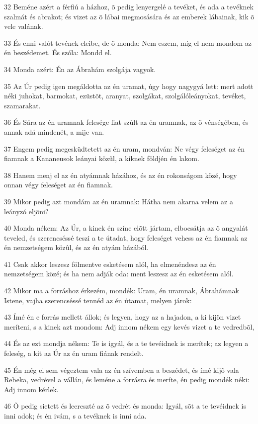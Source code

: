 \par 32 Beméne azért a férfiú a házhoz, õ pedig lenyergelé a tevéket, és ada a tevéknek szalmát és abrakot; és vizet az õ lábai megmosására és az emberek lábainak, kik õ vele valának.
\par 33 És enni valót tevének eleibe, de õ monda: Nem eszem, míg el nem mondom az én beszédemet. És szóla: Mondd el.
\par 34 Monda azért: Én az Ábrahám szolgája vagyok.
\par 35 Az Úr pedig igen megáldotta az én uramat, úgy hogy nagygyá lett: mert adott néki juhokat, barmokat, ezüstöt, aranyat, szolgákat, szolgálóleányokat, tevéket, szamarakat.
\par 36 És Sára az én uramnak felesége fiat szûlt az én uramnak, az õ vénségében, és annak adá mindenét, a mije van.
\par 37 Engem pedig megesküdtetett az én uram, mondván: Ne végy feleséget az én fiamnak a Kananeusok leányai közûl, a kiknek földjén én lakom.
\par 38 Hanem menj el az én atyámnak házához, és az én rokonságom közé, hogy onnan végy feleséget az én fiamnak.
\par 39 Mikor pedig azt mondám az én uramnak: Hátha nem akarna velem az a leányzó eljõni?
\par 40 Monda nékem: Az Úr, a kinek én színe elõtt jártam, elbocsátja az õ angyalát teveled, és szerencséssé teszi a te útadat, hogy feleséget vehess az én fiamnak az én nemzetségem közûl, és az én atyám házából.
\par 41 Csak akkor leszesz fölmentve esketésem alól, ha elmenéndesz az én nemzetségem közé; és ha nem adják oda: ment leszesz az én esketésem alól.
\par 42 Mikor ma a forráshoz érkezém, mondék: Uram, én uramnak, Ábrahámnak Istene, vajha szerencséssé tennéd az én útamat, melyen járok:
\par 43 Ímé én e forrás mellett állok; és legyen, hogy az a hajadon, a ki kijön vizet meríteni, s a kinek azt mondom: Adj innom nékem egy kevés vizet a te vedredbõl,
\par 44 És az ezt mondja nékem: Te is igyál, és a te tevéidnek is merítek; az legyen a feleség, a kit az Úr az én uram fiának rendelt.
\par 45 Én még el sem végeztem vala az én szívemben a beszédet, és ímé kijõ vala Rebeka, vedrével a vállán, és leméne a forrásra és meríte, én pedig mondék néki: Adj innom kérlek.
\par 46 Õ pedig sietett és leereszté az õ vedrét és monda: Igyál, sõt a te tevéidnek is inni adok; és én ivám, s a tevéknek is inni ada.
